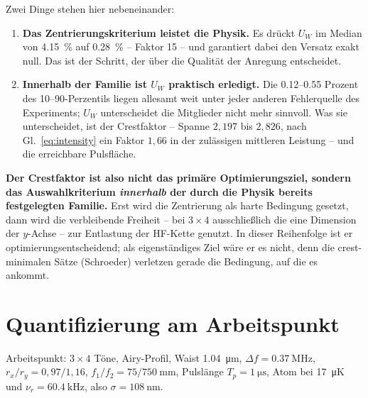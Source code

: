\documentclass[11pt,a4paper]{article}
\newcommand{\Uw}{\ensuremath{U_W}}
\begin{document}
Zwei Dinge stehen hier nebeneinander:

\begin{enumerate}\itemsep0.3em
  \item \textbf{Das Zentrierungskriterium leistet die Physik.} Es drückt $\Uw$
        im Median von \SI{4.15}{\percent} auf \SI{0.28}{\percent} -- Faktor
        \num{15} -- und garantiert dabei den Versatz exakt null. Das ist der
        Schritt, der über die Qualität der Anregung entscheidet.
  \item \textbf{Innerhalb der Familie ist $\Uw$ praktisch erledigt.} Die
        \numrange{0.12}{0.55} Prozent des 10--90-Perzentils liegen allesamt
        weit unter jeder anderen Fehlerquelle des Experiments; $\Uw$
        unterscheidet die Mitglieder nicht mehr sinnvoll. Was sie
        unterscheidet, ist der Crestfaktor -- Spanne $2{,}197$ bis $2{,}826$,
        nach Gl.~\eqref{eq:intensity} ein Faktor $1{,}66$ in der zulässigen
        mittleren Leistung -- und die erreichbare Pulsfläche.
\end{enumerate}

\medskip
\noindent\textbf{Der Crestfaktor ist also nicht das primäre Optimierungsziel,
sondern das Auswahlkriterium \emph{innerhalb} der durch die Physik bereits
festgelegten Familie.} Erst wird die Zentrierung als harte Bedingung gesetzt,
dann wird die verbleibende Freiheit -- bei $3\times4$ ausschließlich die eine
Dimension der $y$-Achse -- zur Entlastung der HF-Kette genutzt. In dieser
Reihenfolge ist er optimierungsentscheidend; als eigenständiges Ziel wäre er
es nicht, denn die crest-minimalen Sätze (Schroeder) verletzen gerade die
Bedingung, auf die es ankommt.

\section{Quantifizierung am Arbeitspunkt}

Arbeitspunkt: $3\times4$ Töne, Airy-Profil, Waist \SI{1.04}{\micro\meter},
$\Delta f = \SI{0.37}{\mega\hertz}$, $r_x/r_y = 0{,}97/1{,}16$,
$f_1/f_2 = 75/\SI{750}{\milli\meter}$, Pulslänge $T_p=\SI{1}{\micro\second}$,
Atom bei \SI{17}{\micro\kelvin} und $\nu_r=\SI{60.4}{\kilo\hertz}$, also
$\sigma=\SI{108}{\nano\meter}$.
\end{document}
